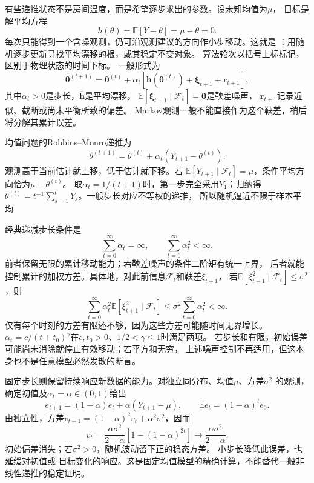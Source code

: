 有些递推状态不是房间温度，而是希望逐步求出的参数。设未知均值为$\mu$，
目标是解平均方程
\begin{equation}
  h(\theta)=\mathbb E[Y-\theta]=\mu-\theta=0.
  \label{eq:stoch-mean-root}
\end{equation}
每次只能得到一个含噪观测，仍可沿观测建议的方向作小步移动。这就是
：用随机逐步更新寻找平均漂移的根，或其稳定不变对象。
算法轮次以括号上标标记，区别于物理状态的时间下标。
一般形式为
\begin{equation}
  \bm\theta^{(t+1)}=\bm\theta^{(t)}+\alpha_t
   [\overline{\bm h}(\bm\theta^{(t)})+\bm\xi_{t+1}+\bm r_{t+1}],
  \label{eq:stoch-general-stochastic-approximation}
\end{equation}
其中$\alpha_t>0$是步长，$\overline{\bm h}$是平均漂移，
$\mathbb E[\bm\xi_{t+1}\mid\mathcal F_t]=\bm0$是鞅差噪声，
$\bm r_{t+1}$记录近似、截断或尚未平衡所致的偏差。
Markov观测一般不能直接作为这个鞅差，稍后将分解其累计误差。

均值问题的Robbins--Monro递推为
\begin{equation}
  \theta^{(t+1)}=\theta^{(t)}
       +\alpha_t(Y_{t+1}-\theta^{(t)}).
  \label{eq:stoch-robbins-monro-mean}
\end{equation}
观测高于当前估计就上移，低于估计就下移。若
$\mathbb E[Y_{t+1}\mid\mathcal F_t]=\mu$，条件平均方向恰为$\mu-\theta^{(t)}$。
取$\alpha_t=1/(t+1)$时，第一步完全采用$Y_1$；归纳得
$\theta^{(t)}=t^{-1}\sum_{s=1}^tY_s$。一般步长对应不等权的递推，
所以随机逼近不限于样本平均

经典递减步长条件是
\begin{equation}
  \sum_{t=0}^\infty\alpha_t=\infty,\qquad
  \sum_{t=0}^\infty\alpha_t^2<\infty.
  \label{eq:stoch-robbins-monro-stepsizes}
\end{equation}
前者保留无限的累计移动能力；若鞅差噪声的条件二阶矩有统一上界，
后者就能控制累计的加权方差。具体地，对此前信息$\mathcal F_t$和鞅差$\xi_{t+1}$，
若$\mathbb E[\xi_{t+1}^2\mid\mathcal F_t]\leq\sigma^2$，则
\[
 \sum_{t=0}^\infty\alpha_t^2
 \mathbb E[\xi_{t+1}^2\mid\mathcal F_t]
 \leq\sigma^2\sum_{t=0}^\infty\alpha_t^2<\infty.
\]
仅有每个时刻的方差有限还不够，因为这些方差可能随时间无界增长。
$\alpha_t=c/(t+t_0)^\gamma$在$c,t_0>0$、$1/2<\gamma\leq1$时满足两项。
若步长和有限，初始误差可能尚未消除就停止有效移动；若平方和无穷，
上述噪声控制不再适用，但这本身也不是任意模型必然发散的断言。

固定步长则保留持续响应新数据的能力。对独立同分布、均值$\mu$、方差$\sigma^2$
的观测，确定初值及$\alpha_t=\alpha\in(0,1)$给出
\[
  e_{t+1}=(1-\alpha)e_t+\alpha(Y_{t+1}-\mu),\qquad
  \mathbb E e_t=(1-\alpha)^t e_0.
\]
由独立性，方差$v_{t+1}=(1-\alpha)^2v_t+\alpha^2\sigma^2$，因而
\[
  v_t=\frac{\alpha\sigma^2}{2-\alpha}
       [1-(1-\alpha)^{2t}]
  \longrightarrow\frac{\alpha\sigma^2}{2-\alpha}.
\]
初始偏差消失；若$\sigma^2>0$，随机波动留下正的稳态方差。
小步长降低此误差，也延缓对初值或
目标变化的响应。这是固定均值模型的精确计算，不能替代一般非线性递推的稳定证明。

